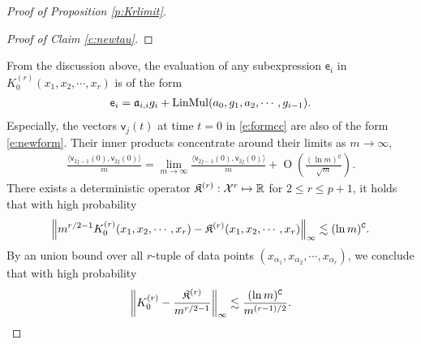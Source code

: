 \documentclass{article}
\numberwithin{equation}{section}
\newcommand\cX{{\mathcal X}}
\newcommand{\fC}{{\mathtt C}}
\newcommand{\fa}{{\frak a}}
\newcommand{\fK}{{\frak K}}
\newcommand{\sfe}{{\mathsf e}}
\newcommand{\sff}{{\mathsf f}}
\newcommand{\sfv}{{\mathsf v}}
\newcommand{\bR}{{\mathbb R}}
\newcommand{\al}{\alpha}
\newcommand{\la}{\lambda}
\DeclareMathOperator{\OO}{O}
\renewcommand{\leq}{\leqslant}
\newcommand{\1}{\mathds{1}}
\theoremstyle{plain} %
\newcommand{\val}{{\rm val}}
\newcommand{\LinMul}{{\rm LinMul}}
\begin{document}
\begin{proof}[Proof of Proposition \ref{p:Krlimit}]
\begin{proof}[Proof of Claim \ref{c:newtau}]
\end{proof}


From the discussion above, the evaluation of any subexpression $\sfe_i$ in $K^{(r)}_0(x_{1}, x_{2}, \cdots, x_{r})$
is of the form
\begin{align}\label{e:newform}
\sfe_i=\fa_{i,i}g_i+\LinMul(a_0,g_1,a_2,\cdots, g_{i-1}).
\end{align}
Especially, the vectors $\sfv_j(t)$ at time $t=0$ in \eqref{e:formcc} are also of the form \eqref{e:newform}. Their inner products  concentrate around their limits as $m\rightarrow \infty$,
\begin{align}\label{e:innerp}
 \frac{\langle \sfv_{2j-1}(0),\sfv_{2j}(0)\rangle}{m}
 =\lim_{m\rightarrow\infty}  \frac{\langle \sfv_{2j-1}(0),\sfv_{2j}(0)\rangle}{m}+\OO\left(\frac{(\ln m)^{\fC}}{\sqrt m}\right).
\end{align}
There exists a deterministic operator $\fK^{(r)}: \cX^r\mapsto \bR$ for $2\leq r\leq p+1$, it holds that with high probability
\begin{align*}
\left\|m^{r/2-1}K^{(r)}_0(x_1,x_2,\cdots, x_r)-\fK^{(r)}(x_1,x_2,\cdots,x_r)\right\|_{\infty}\lesssim (\ln m)^\fC.
\end{align*}
By an union bound over all $r$-tuple of data points $(x_{\al_1},x_{\al_2},\cdots, x_{\al_r})$, we conclude that with high probability
\begin{align*}
\left\|K^{(r)}_0-\frac{\fK^{(r)}}{m^{r/2-1}}\right\|_{\infty}\lesssim \frac{(\ln m)^\fC}{m^{(r-1)/2}}.
\end{align*}



\end{proof}
\end{document}
